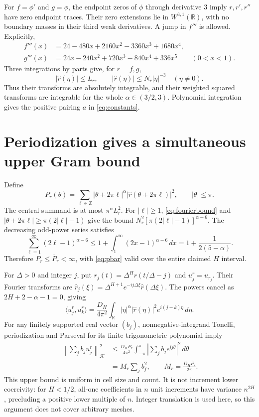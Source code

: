\documentclass[11pt]{article}
\newcommand{\R}{\mathbb R}
\newcommand{\K}{\mathcal K}
\newcommand{\norm}[1]{\left\lVert#1\right\rVert}
\begin{document}
For $f=\phi'$ and $g=\phi$, the endpoint zeros of $\phi$ through derivative 3 imply $r,r',r''$ have zero endpoint traces. Their zero extensions lie in $W^{3,1}(\R)$, with no boundary masses in their third weak derivatives. A jump in $f'''$ is allowed. Explicitly,
\begin{align*}
f'''(x)&=24-480x+2160x^2-3360x^3+1680x^4,\\
g'''(x)&=24x-240x^2+720x^3-840x^4+336x^5
\qquad(0<x<1).
\end{align*}
Three integrations by parts give, for $r=f,g$,
\begin{equation}
|\widehat r(\eta)|\le L_r,\qquad
|\widehat r(\eta)|\le N_r|\eta|^{-3}\quad(\eta\ne0).\label{eq:fourierbound}
\end{equation}
Thus their transforms are absolutely integrable, and their weighted squared transforms are integrable for the whole $\alpha\in(3/2,3)$. Polynomial integration gives the positive pairing $a$ in \eqref{eq:constants}.

\section{Periodization gives a simultaneous upper Gram bound}
Define
\[
P_r(\theta)=\sum_{\ell\in\mathbb Z}|\theta+2\pi\ell|^\alpha
|\widehat r(\theta+2\pi\ell)|^2,\qquad |\theta|\le\pi.
\]
The central summand is at most $\pi^\alpha L_r^2$. For $|\ell|\ge1$, \eqref{eq:fourierbound} and $|\theta+2\pi\ell|\ge\pi(2|\ell|-1)$ give the bound
$N_r^2[\pi(2|\ell|-1)]^{\alpha-6}$. The decreasing odd-power series satisfies
\[
\sum_{\ell=1}^{\infty}(2\ell-1)^{\alpha-6}
\le1+\int_1^\infty(2x-1)^{\alpha-6}\,dx
=1+\frac1{2(5-\alpha)}.
\]
Therefore $P_r\le\overline P_r<\infty$, with \eqref{eq:pbar} valid over the entire claimed $H$ interval.

For $\Delta>0$ and integer $j$, put $r_j(t)=\Delta^H r(t/\Delta-j)$ and $u_j^r=u_{r_j}$. Their Fourier transforms are
$\widehat r_j(\xi)=\Delta^{H+1}e^{-ij\Delta\xi}\widehat r(\Delta\xi)$. The powers cancel as $2H+2-\alpha-1=0$, giving
\begin{equation}
\langle u_j^r,u_k^r\rangle=
\frac{D_H}{4\pi^2}\int_{\R}|\eta|^\alpha|\widehat r(\eta)|^2
 e^{i(j-k)\eta}\,d\eta.\label{eq:gram}
\end{equation}
For any finitely supported real vector $(b_j)$, nonnegative-integrand Tonelli, periodization and Parseval for its finite trigonometric polynomial imply
\begin{align}
\norm{\sum_j b_j u_j^r}_{\K}^2
&\le\frac{D_H\overline P_r}{4\pi^2}
\int_{-\pi}^{\pi}\left|\sum_j b_j e^{ij\theta}\right|^2\,d\theta\nonumber\\
&=M_r\sum_jb_j^2,\qquad M_r=\frac{D_H\overline P_r}{2\pi}.\label{eq:bessel}
\end{align}
This upper bound is uniform in cell size and count. It is not increment lower coercivity: for $H<1/2$, all-one coefficients in $n$ unit increments have variance $n^{2H}$, precluding a positive lower multiple of $n$. Integer translation is used here, so this argument does not cover arbitrary meshes.
\end{document}
